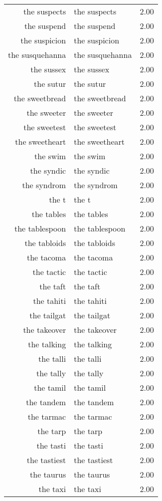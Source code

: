 \begin{table}[ht]
\begin{tabular}{rlr}
  the suspects & the suspects & 2.00 \\ 
  the suspend & the suspend & 2.00 \\ 
  the suspicion & the suspicion & 2.00 \\ 
  the susquehanna & the susquehanna & 2.00 \\ 
  the sussex & the sussex & 2.00 \\ 
  the sutur & the sutur & 2.00 \\ 
  the sweetbread & the sweetbread & 2.00 \\ 
  the sweeter & the sweeter & 2.00 \\ 
  the sweetest & the sweetest & 2.00 \\ 
  the sweetheart & the sweetheart & 2.00 \\ 
  the swim & the swim & 2.00 \\ 
  the syndic & the syndic & 2.00 \\ 
  the syndrom & the syndrom & 2.00 \\ 
  the t & the t & 2.00 \\ 
  the tables & the tables & 2.00 \\ 
  the tablespoon & the tablespoon & 2.00 \\ 
  the tabloids & the tabloids & 2.00 \\ 
  the tacoma & the tacoma & 2.00 \\ 
  the tactic & the tactic & 2.00 \\ 
  the taft & the taft & 2.00 \\ 
  the tahiti & the tahiti & 2.00 \\ 
  the tailgat & the tailgat & 2.00 \\ 
  the takeover & the takeover & 2.00 \\ 
  the talking & the talking & 2.00 \\ 
  the talli & the talli & 2.00 \\ 
  the tally & the tally & 2.00 \\ 
  the tamil & the tamil & 2.00 \\ 
  the tandem & the tandem & 2.00 \\ 
  the tarmac & the tarmac & 2.00 \\ 
  the tarp & the tarp & 2.00 \\ 
  the tasti & the tasti & 2.00 \\ 
  the tastiest & the tastiest & 2.00 \\ 
  the taurus & the taurus & 2.00 \\ 
  the taxi & the taxi & 2.00 \\ 

\end{tabular}
\end{table}
